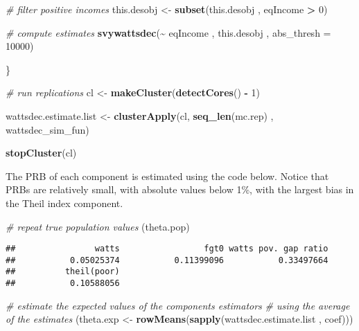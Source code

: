 \documentclass[
]{book}
\newenvironment{Shaded}{\begin{snugshade}}{\end{snugshade}}
\newcommand{\AttributeTok}[1]{\textcolor[rgb]{0.13,0.29,0.53}{#1}}
\newcommand{\CommentTok}[1]{\textcolor[rgb]{0.56,0.35,0.01}{\textit{#1}}}
\newcommand{\DecValTok}[1]{\textcolor[rgb]{0.00,0.00,0.81}{#1}}
\newcommand{\FunctionTok}[1]{\textcolor[rgb]{0.13,0.29,0.53}{\textbf{#1}}}
\newcommand{\NormalTok}[1]{#1}
\newcommand{\OtherTok}[1]{\textcolor[rgb]{0.56,0.35,0.01}{#1}}
\newcommand{\SpecialCharTok}[1]{\textcolor[rgb]{0.81,0.36,0.00}{\textbf{#1}}}
\begin{document}
\begin{Shaded}
\begin{Highlighting}[]
  \CommentTok{\# filter positive incomes}
\NormalTok{  this.desobj }\OtherTok{\textless{}{-}} \FunctionTok{subset}\NormalTok{(this.desobj , eqIncome }\SpecialCharTok{\textgreater{}} \DecValTok{0}\NormalTok{)}
  
  \CommentTok{\# compute estimates}
  \FunctionTok{svywattsdec}\NormalTok{(}\SpecialCharTok{\textasciitilde{}}\NormalTok{ eqIncome , this.desobj , }\AttributeTok{abs\_thresh =} \DecValTok{10000}\NormalTok{)}
  
\NormalTok{\}}

\CommentTok{\# run replications}
\NormalTok{cl }\OtherTok{\textless{}{-}} \FunctionTok{makeCluster}\NormalTok{(}\FunctionTok{detectCores}\NormalTok{() }\SpecialCharTok{{-}} \DecValTok{1}\NormalTok{)}

\NormalTok{wattsdec.estimate.list }\OtherTok{\textless{}{-}}
  \FunctionTok{clusterApply}\NormalTok{(cl, }\FunctionTok{seq\_len}\NormalTok{(mc.rep) , wattsdec\_sim\_fun)}

\FunctionTok{stopCluster}\NormalTok{(cl)}
\end{Highlighting}
\end{Shaded}

The PRB of each component is estimated using the code below. Notice that PRBs are relatively small, with absolute values below 1\%, with the largest bias in the Theil index component.

\begin{Shaded}
\begin{Highlighting}[]
\CommentTok{\# repeat true population values}
\NormalTok{(theta.pop)}
\end{Highlighting}
\end{Shaded}

\begin{verbatim}
##                watts                 fgt0 watts pov. gap ratio 
##           0.05025374           0.11399096           0.33497664 
##          theil(poor) 
##           0.10588056
\end{verbatim}

\begin{Shaded}
\begin{Highlighting}[]
\CommentTok{\# estimate the expected values of the components estimators}
\CommentTok{\# using the average of the estimates}
\NormalTok{(theta.exp }\OtherTok{\textless{}{-}} \FunctionTok{rowMeans}\NormalTok{(}\FunctionTok{sapply}\NormalTok{(wattsdec.estimate.list , coef)))}
\end{Highlighting}
\end{Shaded}
\end{document}
